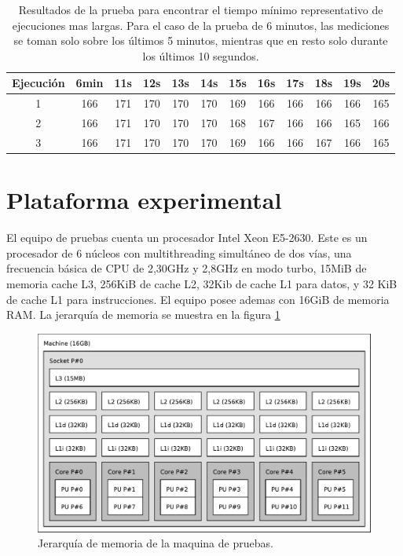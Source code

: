 \begin{table}[h]
	\centering
	\begin{tabular}{c|c|c|c|c|c|c|c|c|c|c|c}

		Ejecución&6min&11s&12s&13s&14s&15s&16s&17s&18s&19s&20s\\

		\hline

		1&166& 171& 170& 170& 170& 169& 166& 166& 166& 166& 165\\

		\hline

		2&166& 171& 170& 170& 170& 168& 167& 166& 166& 165& 166\\

		\hline

		3&166& 171& 170& 170& 170& 169& 166& 166& 167& 166& 165

	\end{tabular}

\caption{Resultados de la prueba para encontrar el tiempo mínimo representativo
	de ejecuciones mas largas. Para el caso de la prueba de 6 minutos, las
	mediciones se toman solo sobre los últimos 5 minutos, mientras que en
	resto solo durante los últimos 10 segundos.}

\label{tabla}

\end{table}

\section{Plataforma experimental}

El equipo de pruebas cuenta un procesador Intel Xeon E5-2630. Este es un
procesador de 6 núcleos con multithreading simultáneo de dos vías, una
frecuencia básica de CPU de 2,30GHz y 2,8GHz en modo turbo, 15MiB de memoria
cache L3, 256KiB de cache L2, 32Kib de cache L1 para datos, y 32 KiB de cache L1
para instrucciones. El equipo posee ademas con 16GiB de memoria RAM. La
jerarquía de memoria se muestra en la figura \ref{topoMemoria}

\begin{figure}[!ht]

	\includegraphics[width=\textwidth]{img/topo.pdf}
	\caption{Jerarquía de memoria de la maquina de pruebas.}

	\label{topoMemoria}

\end{figure}

